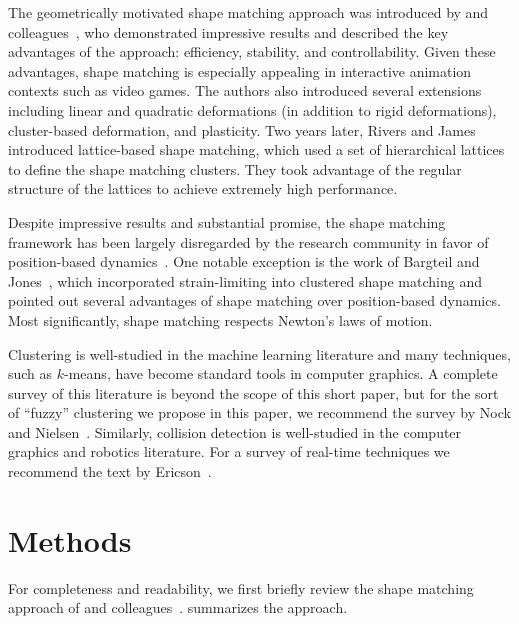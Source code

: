 \documentclass[review]{acmsiggraph}
\begin{document}
The geometrically motivated shape matching approach was introduced by \Mueller and 
colleagues~, who demonstrated impressive results and 
described the key advantages of the approach: efficiency, stability, and controllability.
Given these advantages, shape matching is especially appealing in interactive animation contexts such as
video games.  The authors also introduced several extensions including linear and quadratic deformations 
(in addition to rigid deformations), cluster-based deformation, and plasticity.  
%
Two years later, Rivers and James~ introduced lattice-based shape matching,
which used a set of hierarchical lattices to define the shape matching clusters.  They took advantage
of the regular structure of the lattices to achieve extremely high performance.  

Despite impressive results and substantial promise,
the shape matching framework has been largely disregarded by the research community in favor of position-based
dynamics~\cite{Mueller:2007:PBD,Bender:2013:PBM,Bender:2014:ASO,Macklin:2014:UPP}.  One notable exception is
the work of Bargteil and Jones~, which incorporated strain-limiting into clustered shape matching
and pointed out several advantages of shape matching over position-based dynamics.  Most significantly, shape matching respects Newton's 
laws of motion.

Clustering is well-studied in the machine learning literature and many techniques, such as $k$-means, have become standard tools in computer graphics.  
A complete survey of this literature is beyond the scope of this short paper, but for the sort of ``fuzzy'' clustering we propose in this paper,
we recommend the survey by Nock and Nielsen~.  Similarly, collision detection is well-studied in the 
computer graphics and robotics literature.  For a survey of real-time techniques we recommend the text by Ericson~.

\section{Methods}
For completeness and readability, we first briefly review the shape matching approach of \Mueller and colleagues~.   summarizes the approach.  
\end{document}
